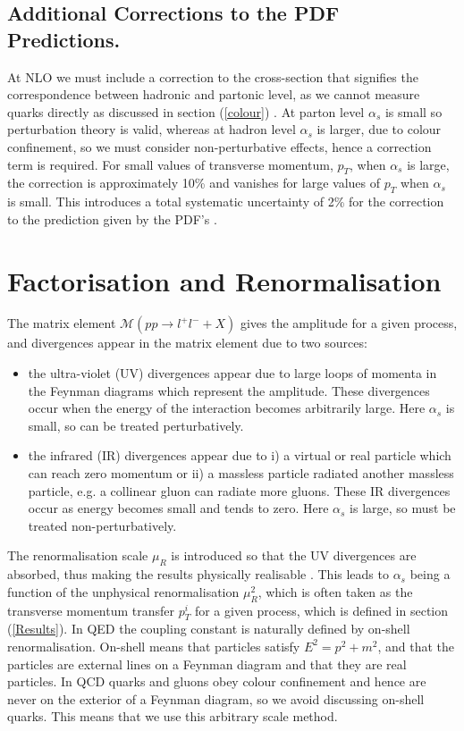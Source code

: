 \documentclass[12pt, onecolumn, nofootinbib]{revtex4}    %
\begin{document}
{\subsection{Additional Corrections to the PDF Predictions.} 
At NLO we must include a correction to the cross-section that signifies the correspondence between hadronic and partonic level, as we cannot measure quarks directly as discussed in section (\ref{colour}) \cite{DMP}. At parton level ${\alpha _s}$  is small so perturbation theory is valid, whereas at hadron level ${\alpha _s}$  is larger, due to colour confinement, so we must consider non-perturbative effects, hence a correction term is required. For small values of transverse momentum, ${p_T}$, when ${\alpha_s}$ is large,  the correction is approximately 10\% and vanishes for large values of ${p_T}$ \cite{HEPP} when ${\alpha_s}$ is small. This introduces a total systematic uncertainty of 2\% for the correction to the prediction given by the PDF's \cite{HEPP}. 



\section{Factorisation and Renormalisation} \label{fact}
The matrix element ${\mathcal{M} (pp \rightarrow l^+l^- + X )}$ gives the amplitude for a given process, and divergences appear in the matrix element due to two sources: 
\begin{itemize}
	\item the ultra-violet (UV) divergences appear due to large loops of momenta in the Feynman diagrams which represent the amplitude. These divergences occur when the energy of the interaction becomes arbitrarily large. Here ${\alpha_s}$ is small, so can be treated perturbatively.
	\item the infrared (IR) divergences appear due to i) a virtual or real particle which can reach zero momentum or ii) a massless particle radiated another massless particle, e.g. a collinear gluon can radiate more gluons. These IR divergences occur as energy becomes small and tends to zero. Here ${\alpha_s}$ is large, so must be treated non-perturbatively.
\end{itemize}


The renormalisation scale ${\mu_R}$ is introduced so that the UV divergences are absorbed, thus making the results physically realisable \cite{PHD}. This leads to ${\alpha _s}$ being a function of the unphysical renormalisation ${\mu_R^2}$, which is often taken as the transverse momentum transfer ${p_T^i}$ for a given process, which is defined in section (\ref{Results}). In QED the coupling constant is naturally defined by on-shell renormalisation. On-shell means that particles satisfy ${E^2 = p^2 + m^2}$, and that the particles are external lines on a Feynman diagram and that they are real particles. In QCD quarks and gluons obey colour confinement and hence are never on the exterior of a Feynman diagram, so we avoid discussing on-shell quarks. This means that we use this arbitrary scale method. 

}
\end{document}
